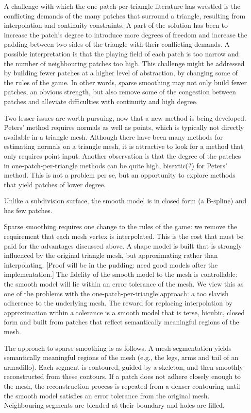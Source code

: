 \documentclass[11pt]{article}
\begin{document}
A challenge with which the one-patch-per-triangle literature has 
wrestled is the conflicting demands of the many patches that surround a triangle,
resulting from interpolation and continuity constraints.
A part of the solution has been to increase the patch's degree to introduce more degrees
of freedom and increase the padding between two sides of the triangle
with their conflicting demands.
A possible interpretation is that the playing field of each patch
is too narrow and the number of neighbouring patches too high.
This challenge might be addressed by building fewer patches at a 
higher level of abstraction,
by changing some of the rules of the game.
In other words, sparse smoothing may not only build fewer patches, an obvious strength,
but also remove some of the congestion between patches and alleviate
difficulties with continuity and high degree.

Two lesser issues are worth pursuing, now that a new method is being developed.
Peters' method requires normals as well as points, which
is typically not directly available in a triangle mesh.
Although there have been many methods for estimating normals on a triangle mesh,
it is attractive to look for a method that only requires point input.
Another observation is that the degree of the patches in one-patch-per-triangle
methods can be quite high, bisextic(?) for Peters' method. 
This is not a problem per se, but an opportunity to explore 
methods that yield patches of lower degree.

Unlike a subdivision surface, the smooth model is in closed form (a B-spline)
and has few patches.

Sparse smoothing requires one change to the rules of the game:
we remove the requirement that each mesh vertex is interpolated.
This is the cost that must be paid for the advantages discussed above.
A shape model is built that is strongly influenced by the original triangle mesh,
but approximating rather than interpolating.
[Proof will be in the pudding: need good models after the implementation.]
The fidelity of the smooth model to the mesh is controllable:
the smooth model will lie within an error tolerance of the mesh.
We view this as one of the problems with the one-patch-per-triangle approach:
a too slavish adherence to the underlying mesh.
The reward for replacing interpolation by approximation within a tolerance
is a smooth model that is terse, bicubic, closed form and built from patches
that reflect semantically meaningful regions of the mesh.

The approach to sparse smoothing is as follows.
A mesh segmentation yields semantically meaningful regions of the mesh
(e.g., the legs, arms and tail of an armadillo).
Each segment is contoured, guided by a skeleton, and then smoothly reconstructed from
these contours.
If a patch does not adhere closely enough to the mesh, the reconstruction process
is repeated from a denser contouring until the smooth model satisfies
an error tolerance from the original mesh.
Neighbouring segments are blended at their boundary and holes are filled.
\end{document}
